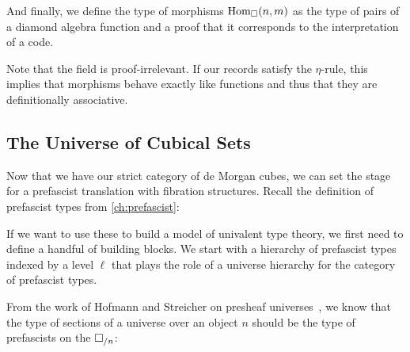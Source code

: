 
And finally, we define the type of morphisms \( \hom[\catCube]{n}{m} \) as the 
type of pairs of a diamond algebra function and a proof that it corresponds to
the interpretation of a code.


Note that the field  is proof-irrelevant.
% 
If our records satisfy the \( \eta \)-rule, this implies that morphisms behave
exactly like functions and thus that they are definitionally associative.


\subsection{The Universe of Cubical Sets}

Now that we have our strict category of de Morgan cubes, we can set the stage 
for a prefascist translation with fibration structures. Recall the definition 
of prefascist types from \cref{ch:prefascist}:


If we want to use these to build a model of univalent type theory, we first 
need to define a handful of building blocks.
% 
We start with a hierarchy of prefascist types indexed by a level \( \ell \) 
that plays the role of a universe hierarchy for the category of prefascist types.
 
From the work of Hofmann and Streicher on presheaf 
universes~, we know that the type of sections of a 
universe over an object \( n \) should be the type of prefascists on the 
% 
% 
\( \catCube_{/n} \):


